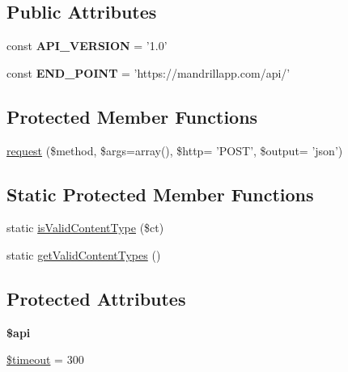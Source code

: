 \subsection*{Public Attributes}
\begin{DoxyCompactItemize}
\item 
\hypertarget{classMandrill_aede0b9389f3ebaed9b5bbc705b7bbbd3}{
const {\bfseries API\_\-VERSION} = '1.0'}
\label{classMandrill_aede0b9389f3ebaed9b5bbc705b7bbbd3}

\item 
\hypertarget{classMandrill_a21d7cf54d512d5c548e907de4fdfd90e}{
const {\bfseries END\_\-POINT} = 'https://mandrillapp.com/api/'}
\label{classMandrill_a21d7cf54d512d5c548e907de4fdfd90e}

\end{DoxyCompactItemize}
\subsection*{Protected Member Functions}
\begin{DoxyCompactItemize}
\item 
\hyperlink{classMandrill_aa521bfc424f451b295ded1c916801afb}{request} (\$method, \$args=array(), \$http= 'POST', \$output= 'json')
\end{DoxyCompactItemize}
\subsection*{Static Protected Member Functions}
\begin{DoxyCompactItemize}
\item 
static \hyperlink{classMandrill_a8a6b67834236ab37ad0e5c83b7bd2695}{isValidContentType} (\$ct)
\item 
static \hyperlink{classMandrill_aa3462b61a5d844683f4fdf0f0068869f}{getValidContentTypes} ()
\end{DoxyCompactItemize}
\subsection*{Protected Attributes}
\begin{DoxyCompactItemize}
\item 
\hypertarget{classMandrill_a5a2c64dc654c458e59994d976f2d421d}{
{\bfseries \$api}}
\label{classMandrill_a5a2c64dc654c458e59994d976f2d421d}

\item 
\hyperlink{classMandrill_ad122e3798f29ec32036cbe9d1f6f223c}{\$timeout} = 300
\end{DoxyCompactItemize}


